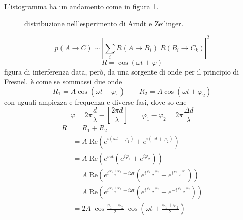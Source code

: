 \bigskip
\noindent
L'istogramma ha un andamento come in figura \ref{arndt_zeilinger_distro}.
\begin{figure}
  \centering
  \caption{distribuzione nell'esperimento di Arndt e Zeilinger.}
  \label{arndt_zeilinger_distro}
\end{figure}
\[
  p(A \rightarrow C) \sim \left|
    \sum_i R(A \rightarrow B_i) \; R(B_i \rightarrow C_k)
  \right|^2 
\]
\[
  R = \cos(\omega t + \varphi)
\]
figura di interferenza data, però, da una sorgente di onde per il principio di Fresnel. è come se sommassi due onde
\[
  R_1 = A \cos \left( \omega t + \varphi_1 \right)
  \qquad
  R_2 = A \cos \left( \omega t + \varphi_2 \right)
\]
con uguali ampiezza e frequenza e diverse fasi, dove so che
\[
  \varphi = 2 \pi \frac{d}{\lambda} - \left[ \frac{2 \pi d}{\lambda} \right]
  \qquad
  \varphi_1 - \varphi_2 = 2 \pi \frac{\Delta d}{\lambda}
\]
\begin{align*}
  R
  &= R_1 + R_2 \\
  &= A \; \mathrm{Re} \left(
    e^{i (\omega t + \varphi_1)} + e^{i (\omega t + \varphi_2)}
  \right) \\
  &= A \; \mathrm{Re} \left(
    e^{i \omega t}\left( e^{i \varphi_1} + e^{i \varphi_2} \right)
  \right) \\
  &= A \; \mathrm{Re} \left(
    e^{i \frac{\varphi_1 + \varphi_2}{2} + i \omega t} \left(
      e^{i \frac{\varphi_1 - \varphi_2}{2}}
      + e^{i \frac{\varphi_2 - \varphi_1}{2}}
    \right)
  \right) \\
  &= A \; \mathrm{Re} \left(
    e^{i \frac{\varphi_1 + \varphi_2}{2} + i  \omega t} \left(
      e^{i \frac{\varphi_1 - \varphi_2}{2}} + e^{-i \frac{\varphi_1 - \varphi_2}{2}}
    \right)
  \right) \\
  &= 2 A \; \cos \frac{\varphi_1 - \varphi_2}{2} \; \cos \left(
    \omega t + \frac{\varphi_1 + \varphi_2}{2}
  \right)
\end{align*}
